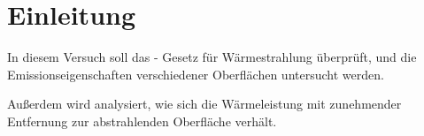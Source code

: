 
\section{Einleitung}
%
In diesem Versuch soll das - Gesetz für Wärmestrahlung überprüft, und die Emissionseigenschaften verschiedener Oberflächen untersucht werden.

Außerdem wird analysiert, wie sich die Wärmeleistung mit zunehmender Entfernung zur abstrahlenden Oberfläche verhält.